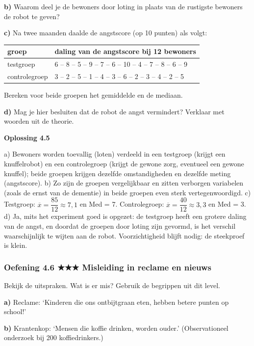 \textbf{b)} Waarom deel je de bewoners door loting in plaats van de rustigste bewoners de robot te geven? \lijn

\textbf{c)} Na twee maanden daalde de angstscore (op 10 punten) als volgt:

\begin{tabular}{ll}
\hline
groep & daling van de angstscore bij 12 bewoners \\
\hline
testgroep & 6 – 8 – 5 – 9 – 7 – 6 – 10 – 4 – 7 – 8 – 6 – 9 \\
controlegroep & 3 – 2 – 5 – 1 – 4 – 3 – 6 – 2 – 3 – 4 – 2 – 5 \\
\hline
\end{tabular}

Bereken voor beide groepen het gemiddelde en de mediaan. \lijn

\textbf{d)} Mag je hier besluiten dat de robot de angst vermindert? Verklaar met woorden uit de theorie. \lijn

\begin{oplossing}
\textbf{Oplossing 4.5}

a) Bewoners worden toevallig (loten) verdeeld in een testgroep (krijgt een knuffelrobot) en een controlegroep (krijgt de gewone zorg, eventueel een gewone knuffel); beide groepen krijgen dezelfde omstandigheden en dezelfde meting (angstscore). b) Zo zijn de groepen vergelijkbaar en zitten verborgen variabelen (zoals de ernst van de dementie) in beide groepen even sterk vertegenwoordigd. c) Testgroep: $\overline{x}=\dfrac{85}{12}\approx 7{,}1$ en Med = 7. Controlegroep: $\overline{x}=\dfrac{40}{12}\approx 3{,}3$ en Med = 3. d) Ja, mits het experiment goed is opgezet: de testgroep heeft een grotere daling van de angst, en doordat de groepen door loting zijn gevormd, is het verschil waarschijnlijk te wijten aan de robot. Voorzichtigheid blijft nodig: de steekproef is klein.
\end{oplossing}

\subsubsection*{Oefening 4.6 \quad ★★★ \quad Misleiding in reclame en nieuws}

Bekijk de uitspraken. Wat is er mis? Gebruik de begrippen uit dit level.

\textbf{a)} Reclame: ‘Kinderen die ons ontbijtgraan eten, hebben betere punten op school!’ \lijn

\textbf{b)} Krantenkop: ‘Mensen die koffie drinken, worden ouder.’ (Observationeel onderzoek bij 200 koffiedrinkers.) \lijn

